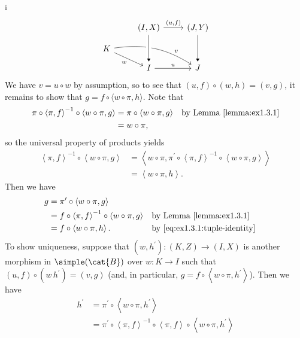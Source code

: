 \begin{partsolution}{i}
\begin{equation*}
\begin{tikzcd}[row sep=small]
& {(I, X)} \arrow[dd, -Triangle] \arrow[r, "{(u, f)}"{above}]
& {(J, Y)} \arrow[dd, -Triangle] \\
K \arrow[dr, "w"{below left}] \arrow[drr, bend left=20, near end, "v"{above right}] \\
& I \arrow[r, "u"]
& J
\arrow[from=uul, to=l, -Triangle, crossing over]
\end{tikzcd}
\end{equation*}
We have \(v = u \circ w\) by assumption, so to see that \((u, f) \circ (w, h) = (v, g)\), it remains to show that \(g = f \circ \langle w\circ\pi, h\rangle\).
Note that
\begin{align*}
\pi \circ \left\langle \pi, f\right\rangle^{-1} \circ \left\langle w \circ \pi, g\right\rangle
&= \pi \circ \left\langle w \circ \pi, g\right\rangle & &\text{by Lemma~\ref{lemma:ex1.3.1}} \\
&= w \circ \pi,
\end{align*}
so the universal property of products yields
\begin{equation}
\label{eq:ex1.3.1:tuple-identity}
\begin{aligned}
\left\langle \pi, f\right\rangle^{-1} \circ \left\langle w \circ \pi, g\right\rangle
&= \left\langle w \circ \pi, \pi^\prime \circ \left\langle\pi, f\right\rangle^{-1} \circ \left\langle w \circ \pi, g\right\rangle\right\rangle \\
&= \left\langle w \circ \pi, h\right\rangle.
\end{aligned}
\end{equation}
Then we have
\begin{align*}
g
&= \pi^\prime \circ \left\langle w \circ \pi, g\right\rangle \\
&= f \circ \left\langle \pi, f\right\rangle^{-1} \circ \left\langle w \circ \pi, g\right\rangle & &\text{by Lemma~\ref{lemma:ex1.3.1}} \\
&= f \circ \left\langle w \circ \pi, h\right\rangle. & &\text{by~\eqref{eq:ex1.3.1:tuple-identity}}\
\end{align*}
To show uniqueness, suppose that \((w, h^\prime) : (K, Z) \to (I, X)\) is another morphism in \(\simple(\cat{B})\) over \(w: K \to I\) such that \((u, f) \circ (w\, h^\prime) = (v, g)\) (and, in particular, \(g = f \circ \left\langle w \circ \pi, h^\prime\right\rangle\)).
Then we have
\begin{align*}
h^\prime
&= \pi^\prime \circ \left\langle w \circ \pi, h^\prime\right\rangle \\
&= \pi^\prime \circ \left\langle \pi, f\right\rangle^{-1} \circ \left\langle \pi, f\right\rangle \circ \left\langle w \circ \pi, h^\prime\right\rangle \\

\end{align*}
\end{partsolution}
